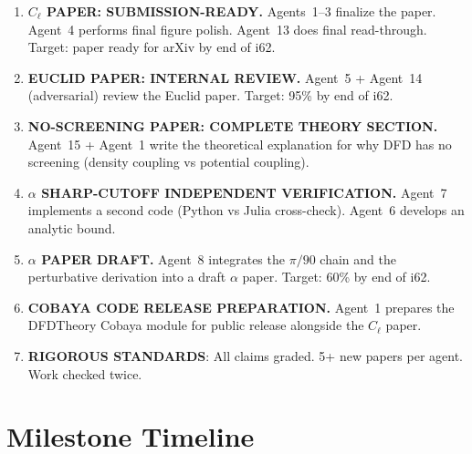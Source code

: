 \documentclass[11pt,a4paper]{article}
\begin{document}
\begin{enumerate}
\item \textbf{$C_\ell$ PAPER: SUBMISSION-READY.} Agents~1--3 finalize the paper. Agent~4 performs final figure polish. Agent~13 does final read-through. Target: paper ready for arXiv by end of i62.

\item \textbf{EUCLID PAPER: INTERNAL REVIEW.} Agent~5 + Agent~14 (adversarial) review the Euclid paper. Target: 95\% by end of i62.

\item \textbf{NO-SCREENING PAPER: COMPLETE THEORY SECTION.} Agent~15 + Agent~1 write the theoretical explanation for why DFD has no screening (density coupling vs potential coupling).

\item \textbf{$\alpha$ SHARP-CUTOFF INDEPENDENT VERIFICATION.} Agent~7 implements a second code (Python vs Julia cross-check). Agent~6 develops an analytic bound.

\item \textbf{$\alpha$ PAPER DRAFT.} Agent~8 integrates the $\pi/90$ chain and the perturbative derivation into a draft $\alpha$ paper. Target: 60\% by end of i62.

\item \textbf{COBAYA CODE RELEASE PREPARATION.} Agent~1 prepares the DFDTheory Cobaya module for public release alongside the $C_\ell$ paper.

\item \textbf{RIGOROUS STANDARDS}: All claims graded. 5+ new papers per agent. Work checked twice.
\end{enumerate}


\section{Milestone Timeline}
\label{sec:timeline}
\end{document}
